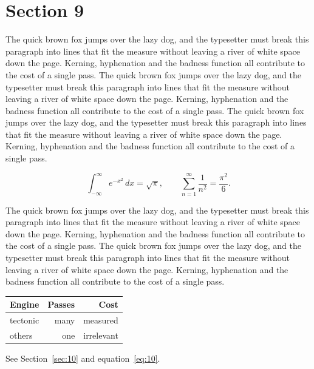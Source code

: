 \documentclass{article}
\begin{document}
\section{Section 9}
\label{sec:9}
The quick brown fox jumps over the lazy dog, and the typesetter must break this paragraph into lines that fit the measure without leaving a river of white space down the page. Kerning, hyphenation and the badness function all contribute to the cost of a single pass. The quick brown fox jumps over the lazy dog, and the typesetter must break this paragraph into lines that fit the measure without leaving a river of white space down the page. Kerning, hyphenation and the badness function all contribute to the cost of a single pass. The quick brown fox jumps over the lazy dog, and the typesetter must break this paragraph into lines that fit the measure without leaving a river of white space down the page. Kerning, hyphenation and the badness function all contribute to the cost of a single pass. 

\begin{equation}\label{eq:9}
\int_{-\infty}^{\infty} e^{-x^{2}}\,dx = \sqrt{\pi}, \qquad
\sum_{n=1}^{\infty} \frac{1}{n^{2}} = \frac{\pi^{2}}{6}.
\end{equation}

The quick brown fox jumps over the lazy dog, and the typesetter must break this paragraph into lines that fit the measure without leaving a river of white space down the page. Kerning, hyphenation and the badness function all contribute to the cost of a single pass. The quick brown fox jumps over the lazy dog, and the typesetter must break this paragraph into lines that fit the measure without leaving a river of white space down the page. Kerning, hyphenation and the badness function all contribute to the cost of a single pass. 

\begin{center}
\begin{tabular}{lrr}
\toprule
Engine & Passes & Cost \\
\midrule
tectonic & many & measured \\
others & one & irrelevant \\
\bottomrule
\end{tabular}
\end{center}

See Section~\ref{sec:10} and equation~\eqref{eq:10}.
\end{document}
